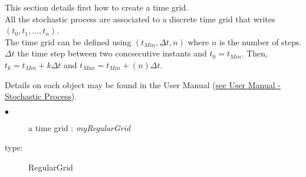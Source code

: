 \renewcommand{\filename}{docUC_TimeGrid.tex}
\renewcommand{\filetitle}{UC : Creation of a time grid}

 \HeaderIILevel

\label{UCtimeGrig}




This section details first how to create a time grid.\\

All the stochastic process are associated to a discrete time grid that writes $(t_0, t_1, \hdots, t_{n})$.\\ 
The time grid can be defined using $(t_{Min}, \Delta t, n)$ where $n$ is the number of steps. $\Delta t$ the time step between two concsecutive instants and $t_0 = t_{Min}$. Then,  $t_k = t_{Min} + k \Delta t$ and $t_{Max} = t_{Min} +  (n) \Delta t$.

Details on each object may be found in the User Manual  (\href{OpenTURNS_UserManual_TUI.pdf}{see User Manual -  Stochastic Process}).\\

{
  \begin{description}
  \item[$\bullet$] a time grid : {\itshape myRegularGrid}
  \item[type:]  RegularGrid
  \end{description}
}

